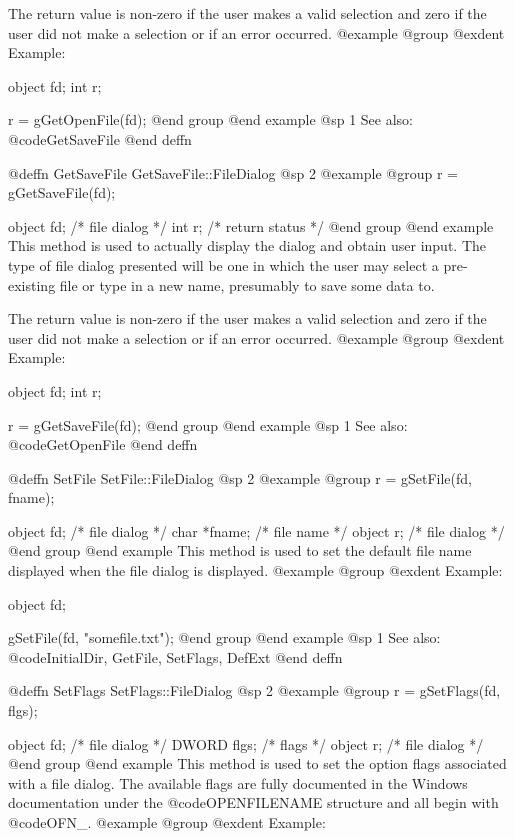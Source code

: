 The return value is non-zero if the user makes a valid selection and
zero if the user did not make a selection or if an error occurred.
@example
@group
@exdent Example:

object  fd;
int     r;

r = gGetOpenFile(fd);
@end group
@end example
@sp 1
See also:  @code{GetSaveFile}
@end deffn






@deffn {GetSaveFile} GetSaveFile::FileDialog
@sp 2
@example
@group
r = gGetSaveFile(fd);

object  fd;     /*  file dialog    */
int     r;      /*  return status  */
@end group
@end example
This method is used to actually display the dialog and obtain user input.
The type of file dialog presented will be one in which the user may
select a pre-existing file or type in a new name, presumably to save some
data to.

The return value is non-zero if the user makes a valid selection and
zero if the user did not make a selection or if an error occurred.
@example
@group
@exdent Example:

object  fd;
int     r;

r = gGetSaveFile(fd);
@end group
@end example
@sp 1
See also:  @code{GetOpenFile}
@end deffn








@deffn {SetFile} SetFile::FileDialog
@sp 2
@example
@group
r = gSetFile(fd, fname);

object  fd;     /*  file dialog  */
char    *fname; /*  file name    */
object  r;      /*  file dialog  */
@end group
@end example
This method is used to set the default file name displayed when the
file dialog is displayed.
@example
@group
@exdent Example:

object  fd;

gSetFile(fd, "somefile.txt");
@end group
@end example
@sp 1
See also:  @code{InitialDir, GetFile, SetFlags, DefExt}
@end deffn







@deffn {SetFlags} SetFlags::FileDialog
@sp 2
@example
@group
r = gSetFlags(fd, flgs);

object  fd;     /*  file dialog  */
DWORD   flgs;   /*  flags        */
object  r;      /*  file dialog  */
@end group
@end example
This method is used to set the option flags associated with a file dialog.
The available flags are fully documented in the Windows documentation
under the @code{OPENFILENAME} structure and all begin with @code{OFN_}.
@example
@group
@exdent Example:

